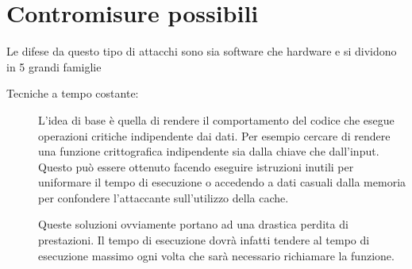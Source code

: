 		\section{Contromisure possibili}
			Le difese da questo tipo di attacchi sono sia software che hardware e si dividono in 5 grandi famiglie\cite{ge2016survey}
			
			\begin{description}
				\item[Tecniche a tempo costante:] L'idea di base è quella di rendere il comportamento del codice che esegue operazioni critiche indipendente dai dati. Per esempio cercare di rendere una funzione crittografica indipendente sia dalla chiave che dall'input. Questo può essere ottenuto facendo eseguire istruzioni inutili per uniformare il tempo di esecuzione o accedendo a dati casuali dalla memoria per confondere l'attaccante sull'utilizzo della cache. 
				
				Queste soluzioni ovviamente portano ad una drastica perdita di prestazioni. Il tempo di esecuzione dovrà infatti tendere al tempo di esecuzione massimo ogni volta che sarà necessario richiamare la funzione.
				

\end{description}
